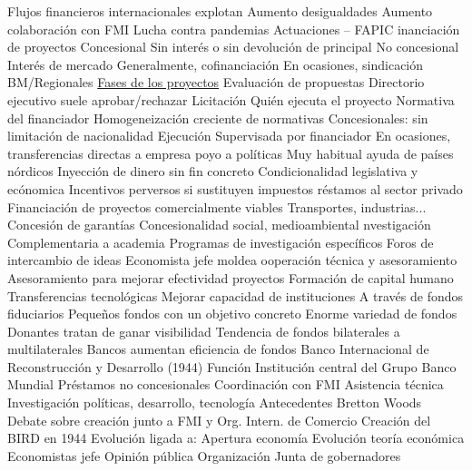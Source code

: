 \documentclass{nuevotema}
\begin{document}
\begin{esquemal}
				\4[] Flujos financieros internacionales explotan
				\4[] Aumento desigualdades
				\4[] Aumento colaboración con FMI
				\4[] Lucha contra pandemias
		\2 Actuaciones -- FAPIC
			\3 inanciación de proyectos
				\4 Concesional
				\4[] Sin interés o sin devolución de principal
				\4 No concesional
				\4[] Interés de mercado
				\4 Generalmente, cofinanciación
				\4 En ocasiones, sindicación BM/Regionales
				\4 \underline{Fases de los proyectos}
				\4[1] Evaluación de propuestas
				\4[] Directorio ejecutivo suele aprobar/rechazar
				\4[2] Licitación
				\4[] Quién ejecuta el proyecto
				\4[] Normativa del financiador
				\4[] Homogeneización creciente de normativas
				\4[] Concesionales: sin limitación de nacionalidad
				\4[3] Ejecución
				\4[] Supervisada por financiador
				\4[] En ocasiones, transferencias directas a empresa
			\3 poyo a políticas
				\4 Muy habitual ayuda de países nórdicos
				\4 Inyección de dinero sin fin concreto
				\4 Condicionalidad legislativa y ecónomica
				\4 Incentivos perversos si sustituyen impuestos
			\3 réstamos al sector privado
				\4 Financiación de proyectos comercialmente viables
				\4 Transportes, industrias...
				\4 Concesión de garantías
				\4 Concesionalidad social, medioambiental
			\3 nvestigación
				\4 Complementaria a academia
				\4 Programas de investigación específicos
				\4 Foros de intercambio de ideas
				\4 Economista jefe moldea
			\3 ooperación técnica y asesoramiento
				\4 Asesoramiento para mejorar efectividad proyectos
				\4 Formación de capital humano
				\4 Transferencias tecnológicas
				\4 Mejorar capacidad de instituciones
				\4 A través de fondos fiduciarios
				\4[] Pequeños fondos con un objetivo concreto
				\4[] Enorme variedad de fondos
				\4[] Donantes tratan de ganar visibilidad
				\4[] Tendencia de fondos bilaterales a multilaterales
				\4[] Bancos aumentan eficiencia de fondos
	\1 
		\2 Banco Internacional de Reconstrucción y Desarrollo (1944)
			\3 Función
				\4 Institución central del Grupo Banco Mundial
				\4 Préstamos no concesionales
				\4 Coordinación con FMI
				\4 Asistencia técnica
				\4 Investigación políticas, desarrollo, tecnología
			\3 Antecedentes
				\4 Bretton Woods
				\4[] Debate sobre creación junto a FMI y Org. Intern. de Comercio
				\4[$\Rightarrow$] Creación del BIRD en 1944
				\4 Evolución ligada a:
				\4[] Apertura economía
				\4[] Evolución teoría económica
				\4[] Economistas jefe
				\4[] Opinión pública
			\3 Organización
				\4 Junta de gobernadores

\end{esquemal}
\end{document}
